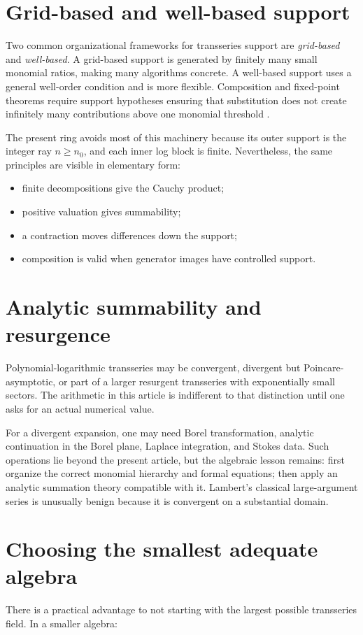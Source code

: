 \documentclass[11pt,oneside,openany]{book}
\begin{document}
\section{Grid-based and well-based support}
Two common organizational frameworks for transseries support are
\emph{grid-based} and \emph{well-based}.  A grid-based support is generated by
finitely many small monomial ratios, making many algorithms concrete.  A
well-based support uses a general well-order condition and is more flexible.
Composition and fixed-point theorems require support hypotheses ensuring that
substitution does not create infinitely many contributions above one monomial
threshold \cite{EdgarComposition}.

The present ring avoids most of this machinery because its outer support is the
integer ray \(n\geq n_0\), and each inner log block is finite.  Nevertheless,
the same principles are visible in elementary form:
\begin{itemize}
\item finite decompositions give the Cauchy product;
\item positive valuation gives summability;
\item a contraction moves differences down the support;
\item composition is valid when generator images have controlled support.
\end{itemize}

\section{Analytic summability and resurgence}
Polynomial-logarithmic transseries may be convergent, divergent but
Poincare-asymptotic, or part of a larger resurgent transseries with
exponentially small sectors.  The arithmetic in this article is indifferent to
that distinction until one asks for an actual numerical value.

For a divergent expansion, one may need Borel transformation, analytic
continuation in the Borel plane, Laplace integration, and Stokes data.  Such
operations lie beyond the present article, but the algebraic lesson remains:
first organize the correct monomial hierarchy and formal equations; then apply
an analytic summation theory compatible with it.  Lambert's classical
large-argument series is unusually benign because it is convergent on a
substantial domain.

\section{Choosing the smallest adequate algebra}
There is a practical advantage to not starting with the largest possible
transseries field.  In a smaller algebra:
\end{document}
